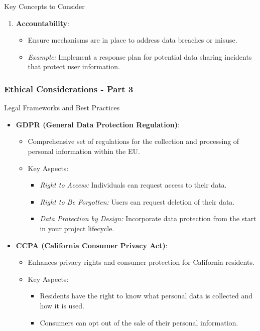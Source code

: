 \documentclass{beamer}
\begin{document}
\begin{frame}[fragile]
\begin{block}{Key Concepts to Consider}
\begin{enumerate}
            \item \textbf{Accountability}:
            \begin{itemize}
                \item Ensure mechanisms are in place to address data breaches or misuse.
                \item \textit{Example:} Implement a response plan for potential data sharing incidents that protect user information.
            \end{itemize}
        \end{enumerate}
    \end{block}
\end{frame}

\begin{frame}[fragile]
    \frametitle{Ethical Considerations - Part 3}
    \begin{block}{Legal Frameworks and Best Practices}
        \begin{itemize}
            \item \textbf{GDPR (General Data Protection Regulation)}:
            \begin{itemize}
                \item Comprehensive set of regulations for the collection and processing of personal information within the EU.
                \item Key Aspects:
                \begin{itemize}
                    \item \textit{Right to Access:} Individuals can request access to their data.
                    \item \textit{Right to Be Forgotten:} Users can request deletion of their data.
                    \item \textit{Data Protection by Design:} Incorporate data protection from the start in your project lifecycle.
                \end{itemize}
            \end{itemize}

            \item \textbf{CCPA (California Consumer Privacy Act)}:
            \begin{itemize}
                \item Enhances privacy rights and consumer protection for California residents.
                \item Key Aspects:
                \begin{itemize}
                    \item Residents have the right to know what personal data is collected and how it is used.
                    \item Consumers can opt out of the sale of their personal information.
                \end{itemize}
            \end{itemize}


\end{itemize}
\end{block}
\end{frame}
\end{document}
